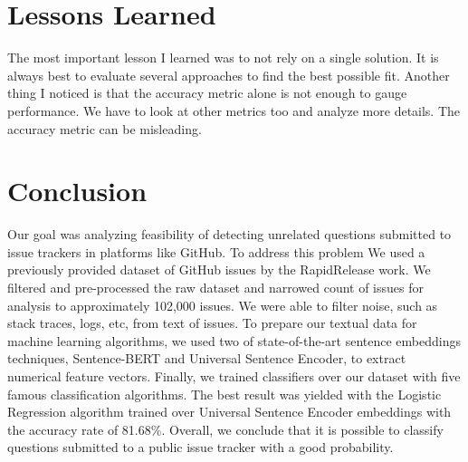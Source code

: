 \documentclass[conference]{IEEEtran}
\begin{document}
\section{Lessons Learned}
The most important lesson I learned was to not rely on a single solution. It is always best to evaluate several 
approaches to find the best possible fit. Another thing I noticed is that the accuracy metric alone is not enough 
to gauge performance. We have to look at other metrics too and analyze more details. The accuracy metric can be 
misleading.

\section{Conclusion}\label{conclusion}
Our goal was analyzing feasibility of detecting unrelated questions submitted to issue trackers in platforms like 
GitHub. To address this problem We used a previously provided dataset of GitHub issues by the RapidRelease work. 
We filtered and pre-processed the raw dataset and narrowed count of issues for analysis to approximately 
102,000 issues. We were able to filter noise, such as stack traces, logs, etc, from text of issues. 
To prepare our textual data for machine learning algorithms, we used two of state-of-the-art sentence embeddings
techniques, Sentence-BERT and Universal Sentence Encoder, to extract numerical feature vectors. Finally, we 
trained classifiers over our dataset with five famous classification algorithms. The best result was yielded
with the Logistic Regression algorithm trained over Universal Sentence Encoder embeddings with the accuracy
rate of 81.68\%. Overall, we conclude that it is possible to classify questions submitted to a public issue tracker
with a good probability. 



\vspace{12pt}
\color{red}
\end{document}
